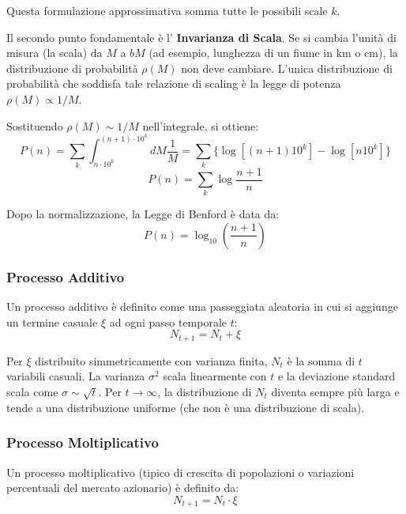 Questa formulazione approssimativa somma tutte le possibili scale $k$.

Il secondo punto fondamentale è l' \textbf{Invarianza di Scala}. Se si cambia l'unità di misura (la scala) da $M$ a $bM$ (ad esempio, lunghezza di un fiume in km o cm), la distribuzione di probabilità $\rho(M)$ non deve cambiare.
L'unica distribuzione di probabilità che soddisfa tale relazione di scaling è la legge di potenza $\rho(M) \propto 1/M$.

Sostituendo $\rho(M) \sim 1/M$ nell'integrale, si ottiene:
\begin{equation}
P(n) = \sum_{k} \int_{n \cdot 10^{k}}^{(n+1) \cdot 10^{k}} dM \frac{1}{M} = \sum_{k} \{\log\left [ (n+1)10^{k}\right ]  - \log\left [n10^{k}\right ] \}
\end{equation}
\begin{equation}
P(n) = \sum_{k} \log \frac{n+1}{n}
\end{equation}

Dopo la normalizzazione, la Legge di Benford è data da:
\begin{equation}
P(n) = \log_{10}\left(\frac{n+1}{n}\right)
\end{equation}


\subsubsection{Processo Additivo}

Un processo additivo è definito come una passeggiata aleatoria in cui si aggiunge un termine casuale $\xi$ ad ogni passo temporale $t$:
\begin{equation}
N_{t+1} = N_t + \xi
\end{equation}

Per $\xi$ distribuito simmetricamente con varianza finita, $N_t$ è la somma di $t$ variabili casuali.
La varianza $\sigma^2$ scala linearmente con $t$ e la deviazione standard scala come $\sigma \sim \sqrt{t}$.
Per $t \to \infty$, la distribuzione di $N_t$ diventa sempre più larga e tende a una distribuzione uniforme (che non è una distribuzione di scala).

\subsubsection{Processo Moltiplicativo}

Un processo moltiplicativo (tipico di crescita di popolazioni o variazioni percentuali del mercato azionario) è definito da:
\begin{equation}
N_{t+1} = N_t \cdot \xi
\end{equation}

